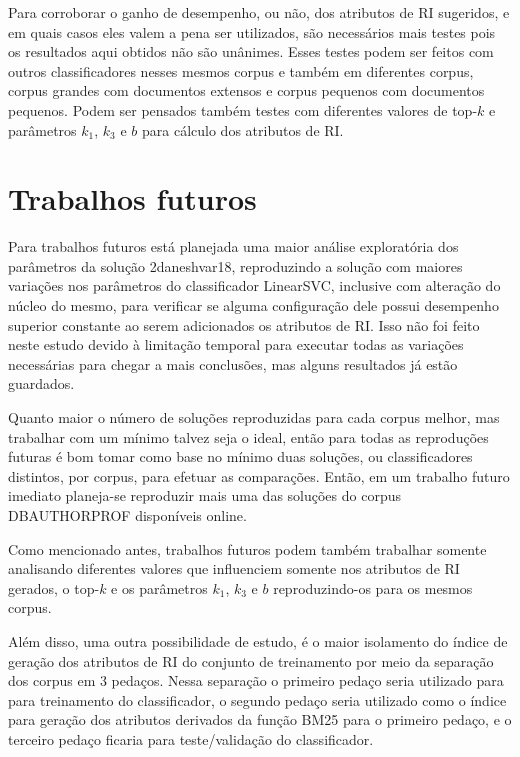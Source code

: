 Para corroborar o ganho de desempenho, ou não, dos atributos de RI sugeridos, e em quais casos eles valem a pena ser utilizados, são necessários mais testes pois os resultados aqui obtidos não são unânimes.
Esses testes podem ser feitos com outros classificadores nesses mesmos corpus e também em diferentes corpus, corpus grandes com documentos extensos e corpus pequenos com documentos pequenos. 
Podem ser pensados também testes com diferentes valores de top-$k$ e parâmetros $k_1$, $k_3$ e $b$ para cálculo dos atributos de RI.


% 
\section{Trabalhos futuros}
    Para trabalhos futuros está planejada uma maior análise exploratória dos parâmetros da solução 2\underscore{}daneshvar18, reproduzindo a solução com maiores variações nos parâmetros do classificador LinearSVC, inclusive com alteração do núcleo do mesmo, para verificar se alguma configuração dele possui desempenho superior constante ao serem adicionados os atributos de RI. 
    Isso não foi feito neste estudo devido à limitação temporal para executar todas as variações necessárias para chegar a mais conclusões, mas alguns resultados já estão guardados.

    Quanto maior o número de soluções reproduzidas para cada corpus melhor, mas trabalhar com um mínimo talvez seja o ideal, então para todas as reproduções futuras é bom tomar como base no mínimo duas soluções, ou classificadores distintos, por corpus, para efetuar as comparações.
    Então, em um trabalho futuro imediato planeja-se reproduzir mais uma das soluções do corpus DB\underscore{}AUTHORPROF disponíveis online.

    Como mencionado antes, trabalhos futuros podem também trabalhar somente analisando diferentes valores que influenciem somente nos atributos de RI gerados, o top-$k$ e os parâmetros $k_1$, $k_3$ e $b$ reproduzindo-os para os mesmos corpus.

    Além disso, uma outra possibilidade de estudo, é o maior isolamento do índice de geração dos atributos de RI do conjunto de treinamento por meio da separação dos corpus em 3 pedaços.
    Nessa separação o primeiro pedaço seria utilizado para para treinamento do classificador, o segundo pedaço seria utilizado como o índice para geração dos atributos derivados da função BM25 para o primeiro pedaço, e o terceiro pedaço ficaria para teste/validação do classificador.

